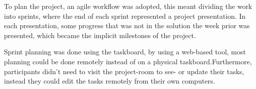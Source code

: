 To plan the project, an agile workflow was adopted, this meant dividing the work into sprints, where the end of each sprint represented a project presentation. In each presentation, some progress that was not in the solution the week prior was presented, which became the implicit milestones of the project.

Sprint planning was done using the \taiga{} taskboard, by using a web-based tool, most planning could be done remotely instead of on a physical taskboard.Furthermore, participants didn't need to visit the project-room to see- or update their tasks, instead they could edit the tasks remotely from their own computers.





